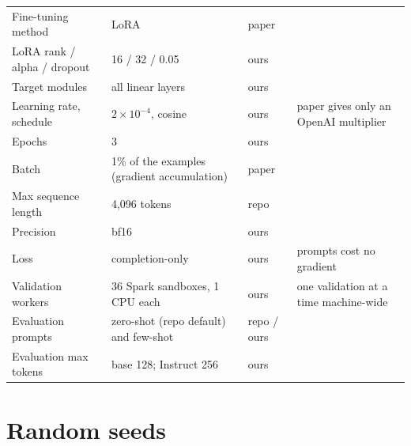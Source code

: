 {\begin{longtable}{@{}p{4.3cm}p{5.5cm}p{1.4cm}p{3.4cm}@{}}
Fine-tuning method & LoRA & paper & \\
LoRA rank / alpha / dropout & 16 / 32 / 0.05 & ours & \\
Target modules & all linear layers & ours & \\
Learning rate, schedule & $2\times10^{-4}$, cosine & ours & paper gives only an OpenAI multiplier\\
Epochs & 3 & ours & \\
Batch & 1\% of the examples (gradient accumulation) & paper & \\
Max sequence length & 4,096 tokens & repo & \\
Precision & bf16 & ours & \\
Loss & completion-only & ours & prompts cost no gradient\\
Validation workers & 36 Spark sandboxes, 1 CPU each & ours & one validation at a time machine-wide\\
Evaluation prompts & zero-shot (repo default) and few-shot & repo / ours & \\
Evaluation max tokens & base 128; Instruct 256 & ours & \\
\end{longtable}
}

\section{Random seeds}\label{sec:seeds}

